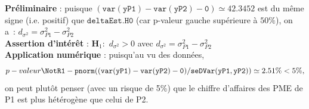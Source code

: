 \documentclass[10pt]{report}
\begin{document}
\begin{exercice}
\begin{enumerate}
\begin{Correction}
\noindent \textbf{Préliminaire} : puisque $\mathtt{(var(yP1)-var(yP2)-0)}\simeq42.3452$ est du même signe (i.e. positif) que $\mathtt{deltaEst.H0}$ (car p-valeur gauche supérieure à $50\%$), on a~: 
       $d_{\sigma^2}=\sigma^2_{P1}-\sigma^2_{P2}$\\
\noindent \textbf{Assertion d'intérêt} :  $\mathbf{H}_1:$ $d_{\sigma^2}>0$ avec  $d_{\sigma^2}=\sigma^2_{P1}-\sigma^2_{P2}$ \\
\textbf{Application numérique} :  puisqu'au vu des données, 
  \[
p-valeur\NotR\mathtt{1-pnorm((var(yP1)-var(yP2)-0)/seDVar(yP1,yP2))} \simeq 2.51\% < 5\%,
\]
on peut plutôt penser (avec un risque de 5\%) que le chiffre d'affaires des PME de P1 est plus hétérogène que celui de P2.
\end{Correction}




\end{enumerate}
\end{exercice}
\end{document}
